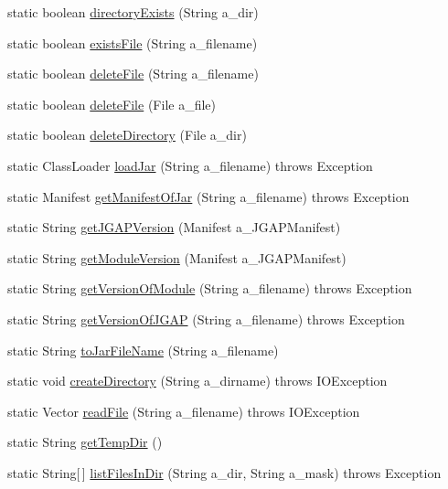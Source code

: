 \begin{DoxyCompactItemize}
\item 
static boolean \hyperlink{classorg_1_1jgap_1_1util_1_1_file_kit_a0a4578fb4ffa6e6babfaf3e3342cd459}{directory\-Exists} (String a\-\_\-dir)
\item 
static boolean \hyperlink{classorg_1_1jgap_1_1util_1_1_file_kit_a367f99852e55e235336e551b669fe372}{exists\-File} (String a\-\_\-filename)
\item 
static boolean \hyperlink{classorg_1_1jgap_1_1util_1_1_file_kit_a35bf5332916107e4d2301c72218d639a}{delete\-File} (String a\-\_\-filename)
\item 
static boolean \hyperlink{classorg_1_1jgap_1_1util_1_1_file_kit_a25ce2d0a2883dc2cf8429d5892b89487}{delete\-File} (File a\-\_\-file)
\item 
static boolean \hyperlink{classorg_1_1jgap_1_1util_1_1_file_kit_a93b7be77bdd14053d7a0a730183755b6}{delete\-Directory} (File a\-\_\-dir)
\item 
static Class\-Loader \hyperlink{classorg_1_1jgap_1_1util_1_1_file_kit_aeea41ab4c815f7b72e9d4b6423719634}{load\-Jar} (String a\-\_\-filename)  throws Exception 
\item 
static Manifest \hyperlink{classorg_1_1jgap_1_1util_1_1_file_kit_aa6c68d790ceffa2014b4ac2ca32b5da4}{get\-Manifest\-Of\-Jar} (String a\-\_\-filename)  throws Exception 
\item 
static String \hyperlink{classorg_1_1jgap_1_1util_1_1_file_kit_a8bb10bbdee9a0fc0223d8ebf5056d524}{get\-J\-G\-A\-P\-Version} (Manifest a\-\_\-\-J\-G\-A\-P\-Manifest)
\item 
static String \hyperlink{classorg_1_1jgap_1_1util_1_1_file_kit_ad337c025bd76665eb7f68f535f867193}{get\-Module\-Version} (Manifest a\-\_\-\-J\-G\-A\-P\-Manifest)
\item 
static String \hyperlink{classorg_1_1jgap_1_1util_1_1_file_kit_ae5aa2bfc7d1c83135b94d266516321c7}{get\-Version\-Of\-Module} (String a\-\_\-filename)  throws Exception 
\item 
static String \hyperlink{classorg_1_1jgap_1_1util_1_1_file_kit_aaee89d9ba61e0c7f4c4970606e5e8e71}{get\-Version\-Of\-J\-G\-A\-P} (String a\-\_\-filename)  throws Exception 
\item 
static String \hyperlink{classorg_1_1jgap_1_1util_1_1_file_kit_a0e1df1b352e7b8122d001a366dffb9ae}{to\-Jar\-File\-Name} (String a\-\_\-filename)
\item 
static void \hyperlink{classorg_1_1jgap_1_1util_1_1_file_kit_ac1fa4723653b4f0c12575c80c822c8ec}{create\-Directory} (String a\-\_\-dirname)  throws I\-O\-Exception 
\item 
static Vector \hyperlink{classorg_1_1jgap_1_1util_1_1_file_kit_a700991efb0b5ace692c85f10cd260fa2}{read\-File} (String a\-\_\-filename)  throws I\-O\-Exception 
\item 
static String \hyperlink{classorg_1_1jgap_1_1util_1_1_file_kit_ac8c9537fe96eace57ea9d7b2e1c375e9}{get\-Temp\-Dir} ()
\item 
static String\mbox{[}$\,$\mbox{]} \hyperlink{classorg_1_1jgap_1_1util_1_1_file_kit_a0afe6a5e11024dc5b0bc7f5c9c168d6e}{list\-Files\-In\-Dir} (String a\-\_\-dir, String a\-\_\-mask)  throws Exception 
\end{DoxyCompactItemize}
